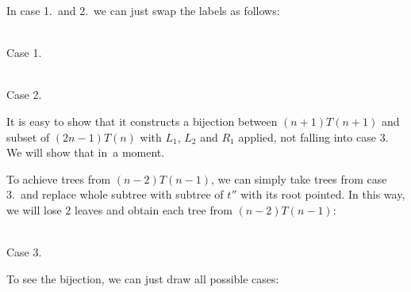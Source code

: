 \documentclass[final]{article}
\theoremstyle{definition}
\theoremstyle{definition}
\theoremstyle{remark}
\begin{document}
In case 1.~and 2.~we can just swap the labels as follows:

\begin{center}
    \begin{minipage}[t]{.3\textwidth}
        \begin{center}
            \\
            Case 1.
        \end{center}
    \end{minipage}%
    \begin{minipage}[t]{.3\textwidth}
        \begin{center}
            \\
            Case 2.
        \end{center}
    \end{minipage}%
\end{center}

It is easy to show that it constructs a bijection between \((n + 1) T(n + 1)\) and subset of \((2 n - 1) T(n)\) with \(L_1\), \(L_2\) and \(R_1\) applied, not falling into case 3. We will show that in~a moment.

To achieve trees from \((n - 2) T(n - 1)\), we can simply take trees from case 3.~and replace whole subtree with subtree of \(t''\) with its root pointed. In this way, we will lose \(2\) leaves and obtain each tree from \((n - 2) T(n - 1)\):

\begin{center}
    \begin{minipage}[t]{.3\textwidth}
        \begin{center}
            \\
            Case 3.
        \end{center}
    \end{minipage}%
\end{center}

To see the bijection, we can just draw all possible cases:
\end{document}
